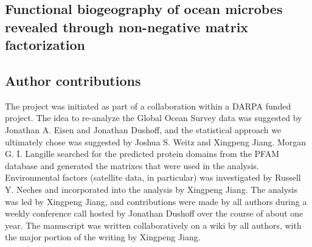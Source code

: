 \begin{refsection}
\chapter{Functional biogeography of ocean microbes revealed through non-negative matrix factorization}


\section{Author contributions}

The project was initiated as part of a collaboration within a DARPA funded project. The idea to re-analyze the Global Ocean Survey data was suggested by Jonathan A. Eisen and Jonathan Dushoff, and the statistical approach we ultimately chose was suggested by Joshua S. Weitz and Xingpeng Jiang. Morgan G. I. Langille searched for the predicted protein domains from the PFAM database and generated the matrixes that were used in the analysis. Environmental factors (satellite data, in particular) was investigated by Russell Y. Neches and incorporated into the analysis by Xingpeng Jiang. The analysis was led by Xingpeng Jiang, and contributions were made by all authors during a weekly conference call hosted by Jonathan Dushoff over the course of about one year. The manuscript was written collaboratively on a wiki by all authors, with the major portion of the writing by Xingpeng Jiang.











\printbibliography[heading=subbibliography]



\end{refsection}

